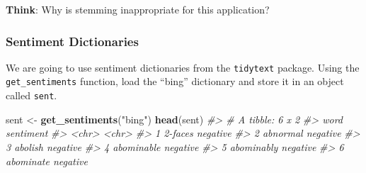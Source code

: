 \documentclass[]{book}
\newenvironment{Shaded}{\begin{snugshade}}{\end{snugshade}}
\newcommand{\KeywordTok}[1]{\textcolor[rgb]{0.13,0.29,0.53}{\textbf{#1}}}
\newcommand{\DataTypeTok}[1]{\textcolor[rgb]{0.13,0.29,0.53}{#1}}
\newcommand{\StringTok}[1]{\textcolor[rgb]{0.31,0.60,0.02}{#1}}
\newcommand{\CommentTok}[1]{\textcolor[rgb]{0.56,0.35,0.01}{\textit{#1}}}
\newcommand{\OtherTok}[1]{\textcolor[rgb]{0.56,0.35,0.01}{#1}}
\newcommand{\OperatorTok}[1]{\textcolor[rgb]{0.81,0.36,0.00}{\textbf{#1}}}
\newcommand{\NormalTok}[1]{#1}
\begin{document}
\textbf{Think}: Why is stemming inappropriate for this application?

\begin{Shaded}
\end{Shaded}

\subsubsection*{Sentiment Dictionaries}\label{sentiment-dictionaries}

We are going to use sentiment dictionaries from the \texttt{tidytext}
package. Using the \texttt{get\_sentiments} function, load the ``bing''
dictionary and store it in an object called \texttt{sent}.

\begin{Shaded}
\begin{Highlighting}[]
\NormalTok{sent <-}\StringTok{ }\KeywordTok{get_sentiments}\NormalTok{(}\StringTok{"bing"}\NormalTok{)}
\KeywordTok{head}\NormalTok{(sent)}
\CommentTok{#> # A tibble: 6 x 2}
\CommentTok{#>   word       sentiment}
\CommentTok{#>   <chr>      <chr>    }
\CommentTok{#> 1 2-faces    negative }
\CommentTok{#> 2 abnormal   negative }
\CommentTok{#> 3 abolish    negative }
\CommentTok{#> 4 abominable negative }
\CommentTok{#> 5 abominably negative }
\CommentTok{#> 6 abominate  negative}
\end{Highlighting}
\end{Shaded}
\end{document}
